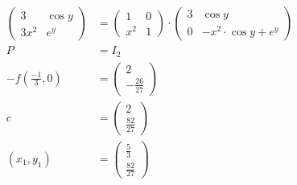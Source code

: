 \begin{align}
\begin{pmatrix}
		3     & \cos y\\
		3 x^2 & e^y
	\end{pmatrix}
	&=
	\begin{pmatrix}
		1   & 0\\
		x^2 & 1
	\end{pmatrix} \cdot 
	\begin{pmatrix}
		3 & \cos y\\
		0 & -x^2 \cdot \cos y + e^y
	\end{pmatrix}\\
	P &= I_2\\
-f ( \frac{-1}{3}, 0) &= \begin{pmatrix} 2\\ -\frac{26}{27}\end{pmatrix}\\
c &= \begin{pmatrix} 2\\ \frac{82}{27} \end{pmatrix}\\
(x_1, y_1) &= \begin{pmatrix} \frac{5}{3}\\ \frac{82}{27}\end{pmatrix}
\end{align}
